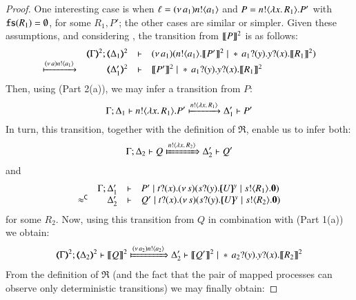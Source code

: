 \begin{proof}
\smallskip

One interesting case is when $\ell = (\nu\, a_1)n ! \langle a_1 \rangle$ and 
$P = n ! \langle \lambda x.\,R_1 \rangle . P'$ with {$\mathtt{fs}(R_1) = \emptyset$}, for some $R_1, P'$; the other cases are similar or simpler. 
Given these assumptions, and considering , the transition from $\llbracket P\rrbracket^{2}$ is as follows:
%
$$
	\mhorel	{\tmap{\Gamma}{2}}
		{\tmap{\Delta_1}{2}}
		{\news{a_1}(\bout{n}{a_1} \pmap{P'}{2} \Par \repl \binp{a_1}{y} \binp{y}{x} \pmap{R_1}{2})}
		{\hby{\news{a}\bactout{n}{a_1}}}
		{\tmap{\Delta_1'}{2}}
		{}
		{\pmap{P'}{2} \Par \repl \binp{a_1}{y} \binp{y}{x} \pmap{R_1}{2}}
$$
Then, using 
 (Part 2(a)), 
we may infer a transition from $P$:
$$\Gamma; \Delta_1 \vdash n ! \langle \lambda x.\,R_1 \rangle . P'
		\xmapsto{n !\langle \lambda x.\,R_1 \rangle}
		\Delta_1' \vdash P'$$
In turn, this transition, together with the definition of 
$\Re$, enable us to infer both:
	\begin{eqnarray*}
		\Gamma; \Delta_2 \proves Q
		\Hby{\bactout{n}{\abs{x}{R_2}}}
		\Delta_2' \proves Q'
	\end{eqnarray*}
	and
	$$
	\mhorel
		{\Gamma}
		{\Delta_1'}
		{P' \Par \binp{t}{x} \newsp{s}{ \binp{s}{y} \mapchar{U}{y} \Par \bout{s}{R_1} \inact }}
		{\fwb}
		{\Delta_2'} 
		{}
		{Q' \Par \binp{t}{x} \newsp{s}{ \binp{s}{y} \mapchar{U}{y} \Par \bout{s}{R_2} \inact }}
$$
for some $R_2$.
	Now, using this transition from $Q$ in combination with  (Part 1(a)) we obtain:
%	
	\begin{eqnarray*}
		\tmap{\Gamma}{2};   \tmap{\Delta_2}{2} \proves \pmap{Q}{2}
		\Hby{\news{a_2}\bactout{n}{a_2}}
		\Delta_2' \proves \pmap{Q'}{2} \Par \repl \binp{a_2}{y} \binp{y}{x} \pmap{R_2}{2}
	\end{eqnarray*}
From the definition of $\Re$ (and the fact that the pair
	of mapped processes can observe only deterministic transitions) we may finally obtain:


\end{proof}
